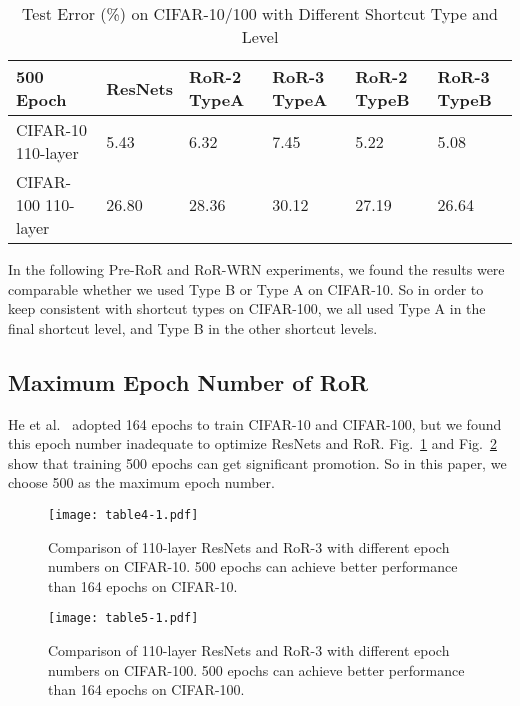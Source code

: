 \documentclass[journal]{IEEEtran}
\begin{document}
\begin{table}[!t]
\renewcommand{\arraystretch}{1.3}
\caption{Test Error (\%) on CIFAR-10/100 with Different Shortcut Type and Level}
\label{tab:shortcuttype}
\centering
\begin{tabular}{|p{1.35cm}|p{0.8cm}|p{0.8cm}|p{0.8cm}|p{0.8cm}|p{0.8cm}|}
\hline
500 Epoch                    &ResNets             &RoR-2 TypeA   &RoR-3 TypeA &RoR-2 TypeB &RoR-3 TypeB \\ \hline\hline
CIFAR-10 110-layer           &5.43                  &6.32          &7.45        &5.22        &5.08        \\\hline
CIFAR-100 110-layer          &26.80               &28.36         &30.12       &27.19       &26.64       \\\hline
\end{tabular}
\end{table}

\par 
In the following Pre-RoR and RoR-WRN experiments, we found the results were comparable whether we used Type B or Type A on CIFAR-10. So in order to keep consistent with shortcut types on CIFAR-100, we all used Type A in the final shortcut level, and Type B in the other shortcut levels. 
\subsection{Maximum Epoch Number of RoR}
He et al.~\cite{he2015resnets,he2016preresnets} adopted 164 epochs to train CIFAR-10 and CIFAR-100, but we found this epoch number inadequate to optimize ResNets and RoR. Fig.~\ref{fig:cifar10epcohnumber} and Fig.~\ref{fig:cifar100epcohnumber} show that training 500 epochs can get significant promotion. So in this paper, we choose 500 as the maximum epoch number.
\begin{figure}
\centering
\texttt{[image: table4-1.pdf]}
\caption{Comparison of 110-layer ResNets and RoR-3 with different epoch numbers on CIFAR-10. 500 epochs can achieve better performance than 164 epochs on CIFAR-10.}
\label{fig:cifar10epcohnumber}
\end{figure}   
\begin{figure}
\centering
\texttt{[image: table5-1.pdf]}
\caption{Comparison of 110-layer ResNets and RoR-3 with different epoch numbers on CIFAR-100. 500 epochs can achieve better performance than 164 epochs on CIFAR-100.}
\label{fig:cifar100epcohnumber}
\end{figure}  
\end{document}

